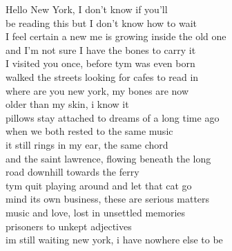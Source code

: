 Hello New York, I don't know if you'll\\
be reading this but I don't know how to wait\\
I feel certain a new me is growing inside the old one\\
and I'm not sure I have the bones to carry it\\
I visited you once, before tym was even born\\
walked the streets looking for cafes to read in\\

where are you new york, my bones are now\\
older than my skin, i know it\\
pillows stay attached to dreams of a long time ago\\
when we both rested to the same music\\
it still rings in my ear, the same chord\\
and the saint lawrence, flowing beneath the long\\
road downhill towards the ferry\\

tym quit playing around and let that cat go\\
mind its own business, these are serious matters\\
music and love, lost in unsettled memories\\
prisoners to unkept adjectives\\
im still waiting new york, i have nowhere else to be\\
